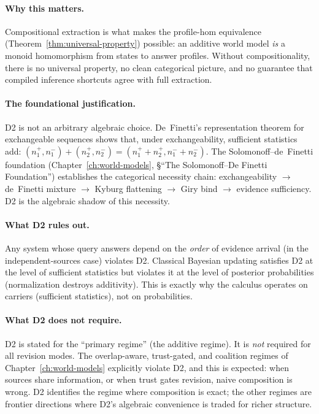 \paragraph{Why this matters.}
Compositional extraction is what makes the profile-hom equivalence
(Theorem~\ref{thm:universal-property}) possible: an additive world
model \emph{is} a monoid homomorphism from states to answer profiles.
Without compositionality, there is no universal property, no clean
categorical picture, and no guarantee that compiled inference shortcuts
agree with full extraction.

\paragraph{The foundational justification.}
D2 is not an arbitrary algebraic choice.  De~Finetti's representation
theorem for exchangeable sequences shows that, under exchangeability,
sufficient statistics add: $(n_1^+, n_1^-) + (n_2^+, n_2^-) =
(n_1^+ + n_2^+, n_1^- + n_2^-)$.  The Solomonoff--de~Finetti
foundation (Chapter~\ref{ch:world-models}, \S``The Solomonoff--De
Finetti Foundation'') establishes the categorical necessity chain:
exchangeability $\to$ de~Finetti mixture $\to$ Kyburg flattening $\to$
Giry bind $\to$ evidence sufficiency.  D2 is the algebraic shadow of
this necessity.

\paragraph{What D2 rules out.}
Any system whose query answers depend on the \emph{order} of evidence
arrival (in the independent-sources case) violates D2.  Classical
Bayesian updating satisfies D2 at the level of sufficient statistics
but violates it at the level of posterior probabilities (normalization
destroys additivity).  This is exactly why the calculus operates on
carriers (sufficient statistics), not on probabilities.

\paragraph{What D2 does not require.}
D2 is stated for the ``primary regime'' (the additive regime).  It is
\emph{not} required for all revision modes.  The overlap-aware,
trust-gated, and coalition regimes of Chapter~\ref{ch:world-models}
explicitly violate D2, and this is expected: when sources share
information, or when trust gates revision, naive composition is wrong.
D2 identifies the regime where composition is exact; the other regimes
are frontier directions where D2's algebraic convenience is traded for
richer structure.

